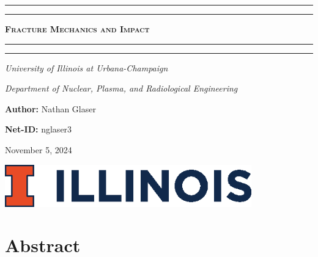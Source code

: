 \documentclass{article}
\begin{document}
\newcommand{\Fig}[3]{\begin{figure}[!h!]\centering\texttt{[image: \#1]}\caption{#2}\label{#3}\end{figure}}
\begin{titlepage}

\centering
\scshape


%
\rule{\textwidth}{1.6pt}\vspace*{-\baselineskip}\vspace*{2pt}
\rule{\textwidth}{0.4pt}

{\Huge \textbf{\textsc{ Fracture Mechanics and Impact \\
\vspace{15pt}}}}

\rule{\textwidth}{0.4pt}\vspace*{-\baselineskip}\vspace{3pt}
\rule{\textwidth}{1.6pt}\vspace{6pt}
\centerline{\textit{University of Illinois at Urbana-Champaign}} 
\centerline{\textit{Department of Nuclear, Plasma, and Radiological Engineering}}
\vspace{1.5\baselineskip}


\large \centerline{\textbf{Author:} Nathan Glaser}
\large \centerline{\textbf{Net-ID:} nglaser3}
\quad
\large \centerline{November 5, 2024}

\vfill{}
\includegraphics[width=0.8\textwidth]{./illinois.eps}\\[1cm]
%
\end{titlepage}

\tableofcontents
\newpage
{}

\section{Abstract}
\end{document}

